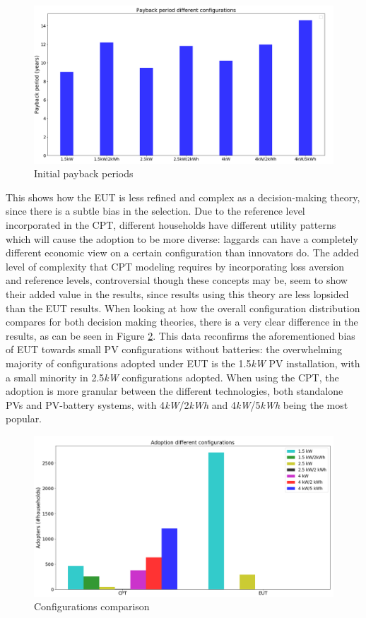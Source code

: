 \begin{figure}[h!]
\centering
\includegraphics[width=12cm]{EUTCompar/Payback.png}
\caption{Initial payback periods}
\label{Figure:payback}
\end{figure}
\newline \newline \noindent
This shows how the EUT is less refined and complex as a decision-making theory, since there is a subtle bias in the selection. Due to the reference level incorporated in the CPT, different households have different utility patterns which will cause the adoption to be more diverse: laggards can have a completely different economic view on a certain configuration than innovators do. The added level of complexity that CPT modeling requires by incorporating loss aversion and reference levels, controversial though these concepts may be, seem to show their added value in the results, since results using this theory are less lopsided than the EUT results. 
\newline \newline \noindent
When looking at how the overall configuration distribution compares for both decision making theories, there is a very clear difference in the results, as can be seen in Figure \ref{Figure:configeut}. This data reconfirms the aforementioned bias of EUT towards small PV configurations without batteries: the overwhelming majority of configurations adopted under EUT is the 1.5\textit{kW} PV installation, with a small minority in 2.5\textit{kW} configurations adopted. When using the CPT, the adoption is more granular between the different technologies, both standalone PVs and PV-battery systems, with 4\textit{kW}/2\textit{kWh} and 4\textit{kW}/5\textit{kWh} being the most popular.
\begin{figure}[h!]
\centering
\includegraphics[width=12cm]{EUTCompar/Config.png}
\caption{Configurations comparison}
\label{Figure:configeut}
\end{figure}
